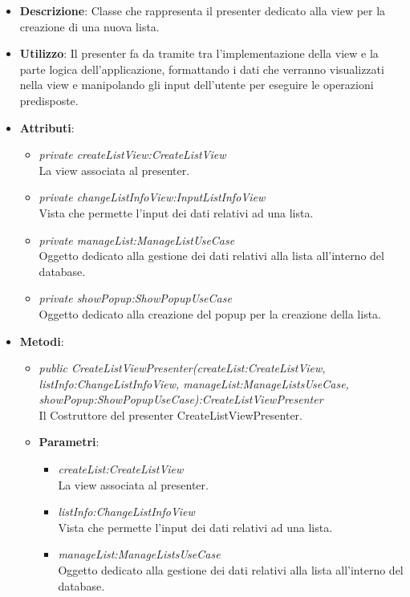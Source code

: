 \begin{itemize}
\item \textbf{Descrizione}: Classe che rappresenta il presenter dedicato alla view per la creazione di una nuova lista.
\item \textbf{Utilizzo}: Il presenter fa da tramite tra l'implementazione della view e la parte logica dell'applicazione, formattando i dati che verranno visualizzati nella view e manipolando gli input dell'utente per eseguire le operazioni predisposte.
\item \textbf{Attributi}: 
	\begin{itemize}
	\item \textit{private createListView:CreateListView}\\
	La view associata al presenter.
	\item \textit{private changeListInfoView:InputListInfoView}\\
	Vista che permette l'input dei dati relativi ad una lista.
	\item \textit{private manageList:ManageListUseCase}\\
	Oggetto dedicato alla gestione dei dati relativi alla lista all'interno del database.
	\item \textit{private showPopup:ShowPopupUseCase}\\
	Oggetto dedicato alla creazione del popup per la creazione della lista.
	\end{itemize}
\item \textbf{Metodi}:
	\begin{itemize}
	\item \textit{public CreateListViewPresenter(createList:CreateListView, listInfo:ChangeListInfoView, manageList:ManageListsUseCase, showPopup:ShowPopupUseCase):CreateListViewPresenter}\\
		Il Costruttore del presenter CreateListViewPresenter.
		\item{\textbf{Parametri}: \begin{itemize}
		\item \textit{createList:CreateListView}\\
			La view associata al presenter.
		\item \textit{listInfo:ChangeListInfoView}\\
			Vista che permette l'input dei dati relativi ad una lista.
		\item \textit{manageList:ManageListsUseCase}\\
			Oggetto dedicato alla gestione dei dati relativi alla lista all'interno del database.

\end{itemize}}
\end{itemize}
\end{itemize}
